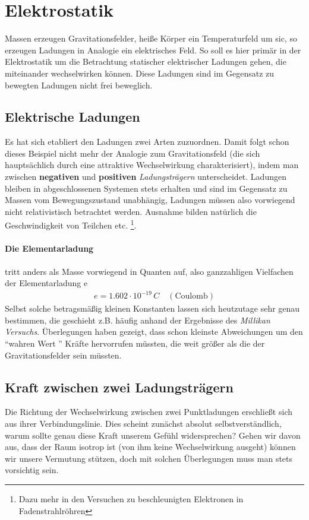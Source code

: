 \section{Elektrostatik}\label{Elektrostatik}Massen erzeugen Gravitationsfelder, heiße Körper ein Temperaturfeld um sic, so erzeugen Ladungen in Analogie ein elektrisches Feld. So soll es hier primär in der Elektrostatik um die Betrachtung statischer elektrischer Ladungen gehen, die miteinander wechselwirken können. Diese Ladungen sind im Gegensatz zu bewegten Ladungen nicht frei beweglich.
\subsection{Elektrische Ladungen}
Es hat sich etabliert den Ladungen zwei Arten zuzuordnen. Damit folgt schon dieses Beispiel nicht mehr der Analogie zum Gravitationsfeld (die sich hauptsächlich  durch eine attraktive Wechselwirkung charakterisiert), indem man zwischen \textbf{negativen} und \textbf{positiven} \textit{Ladungsträgern} unterscheidet. Ladungen bleiben in abgeschlossenen Systemen stets erhalten und sind im Gegensatz zu Massen vom Bewegungszustand unabhängig, Ladungen müssen also vorwiegend nicht relativistisch betrachtet werden. Ausnahme bilden natürlich die Geschwindigkeit von Teilchen etc. \footnote{Dazu mehr in den Versuchen zu beschleunigten Elektronen in Fadenstrahlröhren}. \\
\begin{center}\end{center}
%
%
\paragraph{Die Elementarladung} tritt anders als Masse vorwiegend in Quanten auf, also ganzzahligen Vielfachen der Elementarladung e
\begin{align} \label{kons:Elementarladung}
e = 1.602 \cdot 10^{-19} \, C  \quad \mathrm{(Coulomb)}
\end{align}Selbst solche betragsmäßig kleinen Konstanten lassen sich heutzutage sehr genau bestimmen, die geschieht z.B. häufig anhand der Ergebnisse des \textit{Millikan Versuchs}. Überlegungen haben gezeigt, dass schon kleinste Abweichungen um den "`wahren Wert "' Kräfte hervorrufen müssten, die weit größer als die der Gravitationsfelder sein müssten.

\subsection{Kraft zwischen zwei Ladungsträgern}
Die Richtung der Wechselwirkung zwischen zwei Punktladungen erschließt sich aus ihrer Verbindungslinie. Dies scheint zunächst absolut selbstverständlich, warum sollte genau diese Kraft unserem Gefühl widersprechen? Gehen wir davon aus, dass der Raum isotrop ist (von ihm keine Wechselwirkung ausgeht) können wir unsere Vermutung stützen, doch mit solchen Überlegungen muss man stets vorsichtig sein.


